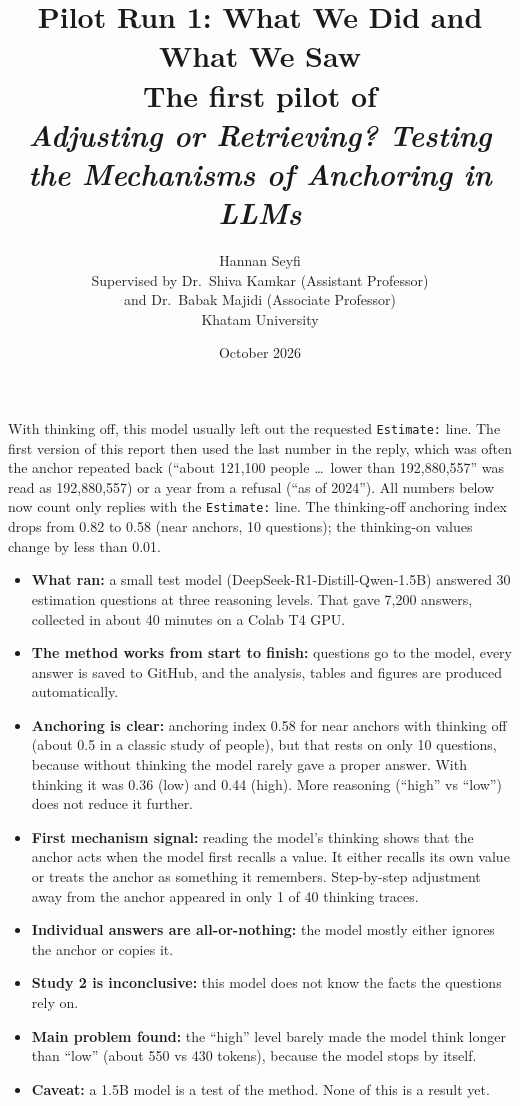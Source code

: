\documentclass[11pt,a4paper]{article}
\title{\textbf{Pilot Run 1: What We Did and What We Saw}\\[4pt]
\large The first pilot of\\
\emph{Adjusting or Retrieving? Testing the Mechanisms of Anchoring in LLMs}}
\author{Hannan Seyfi\\[8pt]
\normalsize Supervised by Dr.\ Shiva Kamkar (Assistant Professor)\\
\normalsize and Dr.\ Babak Majidi (Associate Professor)\\[8pt]
\normalsize Khatam University}
\date{October 2026}
\begin{document}
\maketitle

\begin{tcolorbox}[colback=yellow!8, colframe=orange!60, title=\textbf{Correction (30 October 2026)}, fonttitle=\normalsize]
With thinking off, this model usually left out the requested \texttt{Estimate:} line. The first version of this report then used the last number in the reply, which was often the anchor repeated back (\enquote{about 121,100 people \ldots\ lower than 192,880,557} was read as 192,880,557) or a year from a refusal (\enquote{as of 2024}). All numbers below now count only replies with the \texttt{Estimate:} line. The thinking-off anchoring index drops from 0.82 to 0.58 (near anchors, 10 questions); the thinking-on values change by less than 0.01.
\end{tcolorbox}

\begin{tcolorbox}[colback=gray!6, colframe=gray!50, title=\textbf{At a glance}, fonttitle=\normalsize]
\begin{itemize}[leftmargin=*]
  \item \textbf{What ran:} a small test model (DeepSeek-R1-Distill-Qwen-1.5B) answered 30 estimation questions at three reasoning levels. That gave 7,200 answers, collected in about 40 minutes on a Colab T4 GPU.
  \item \textbf{The method works from start to finish:} questions go to the model, every answer is saved to GitHub, and the analysis, tables and figures are produced automatically.
  \item \textbf{Anchoring is clear:} anchoring index 0.58 for near anchors with thinking off (about 0.5 in a classic study of people), but that rests on only 10 questions, because without thinking the model rarely gave a proper answer. With thinking it was 0.36 (low) and 0.44 (high). More reasoning (\enquote{high} vs \enquote{low}) does not reduce it further.
  \item \textbf{First mechanism signal:} reading the model's thinking shows that the anchor acts when the model first recalls a value. It either recalls its own value or treats the anchor as something it remembers. Step-by-step adjustment away from the anchor appeared in only 1 of 40 thinking traces.
  \item \textbf{Individual answers are all-or-nothing:} the model mostly either ignores the anchor or copies it.
  \item \textbf{Study 2 is inconclusive:} this model does not know the facts the questions rely on.
  \item \textbf{Main problem found:} the \enquote{high} level barely made the model think longer than \enquote{low} (about 550 vs 430 tokens), because the model stops by itself.
  \item \textbf{Caveat:} a 1.5B model is a test of the method. None of this is a result yet.
\end{itemize}
\end{tcolorbox}
\end{document}
